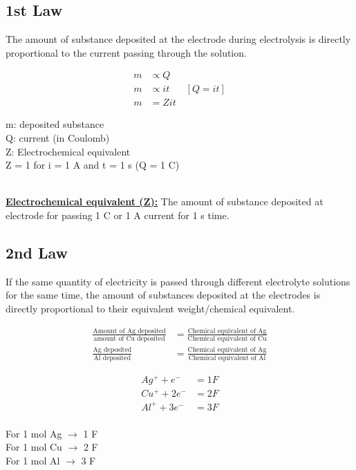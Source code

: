 \documentclass[12pt]{article}
\begin{document}
\subsection*{1st Law}
The amount of substance deposited at the electrode during electrolysis is directly proportional to the current passing through the solution. \\
\begin{minipage}{0.4\textwidth}
    \begin{align*}
        m &\propto Q \\
        m &\propto it \; \; \; \; \; \; [Q = it] \\
        m &= Zit
    \end{align*}
\end{minipage}
\hfill\vline\hfill
\begin{minipage}{0.5\textwidth}
    m: deposited substance \\
    Q: current (in Coulomb) \\
    Z: Electrochemical equivalent \\
    Z = 1 for i = 1 A and t = 1 s (Q = 1 C)
\end{minipage} \\
\underline{\textbf{Electrochemical equivalent (Z):}} The amount of substance deposited at electrode for passing 1 C or 1 A current for 1 s time. \\

\subsection*{2nd Law}
If the same quantity of electricity is passed through different electrolyte solutions for the same time, the amount of substances deposited at the electrodes is directly proportional to their equivalent weight/chemical equivalent.

\begin{align*}
    \frac{\text{Amount of Ag deposited}}{\text{amount of Cu deposited}} &= \frac{\text{Chemical equivalent of Ag}}{\text{Chemical equivalent of Cu}} \\
    \frac{\text{Ag deposited}}{\text{Al deposited}} &= \frac{\text{Chemical equivalent of Ag}}{\text{Chemical equivalent of Al}} 
\end{align*}

\begin{minipage}{0.45\textwidth}
    \begin{align*}
        Ag^+ + e^- &= 1F \\
        Cu^+ + 2e^- &= 2F \\
        Al^+ + 3e^- &= 3F \\
    \end{align*}
\end{minipage}
\hfill\vline\hfill
\begin{minipage}{0.45\textwidth}
    For 1 mol Ag $\rightarrow$ 1 F \\
    For 1 mol Cu $\rightarrow$ 2 F \\
    For 1 mol Al $\rightarrow$ 3 F \\
\end{minipage}
\end{document}
